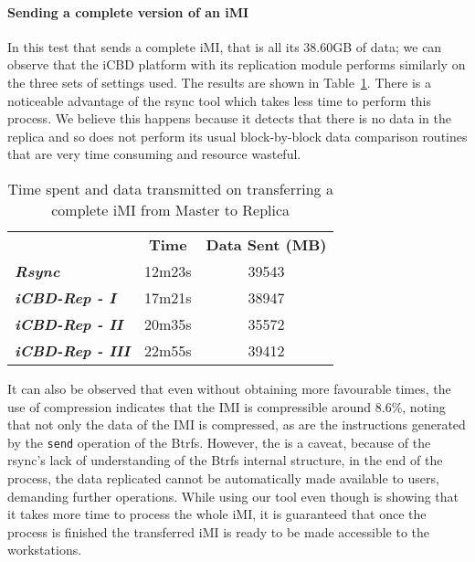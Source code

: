 
\paragraph{Sending a complete version of an iMI}
\label{par:eval_iMI_full}

In this test that sends a complete iMI, that is all its 38.60GB of data; we can observe that the iCBD platform with its replication module performs similarly on the three sets of settings used. The results are shown in Table~\ref{tab:eval_imifull}. There is a noticeable advantage of the rsync tool which takes less time to perform this process. We believe this happens because it detects that there is no data in the replica and so does not perform its usual block-by-block data comparison routines that are very time consuming and resource wasteful. 

\begin{table}[h]
\centering
\begin{tabular}{lcc}
 & \textbf{Time} & \textbf{Data Sent (MB)} \\ \cline{2-3} 
\textit{\textbf{Rsync}} & 12m23s & 39543 \\
\textit{\textbf{iCBD-Rep - I}} & 17m21s & 38947 \\
\textit{\textbf{iCBD-Rep - II}} & 20m35s & 35572 \\
\textit{\textbf{iCBD-Rep - III}} & 22m55s & 39412
\end{tabular}
\caption{Time spent and data transmitted on transferring a complete iMI from Master to Replica}
\label{tab:eval_imifull}
\end{table}

It can also be observed that even without obtaining more favourable times, the use of compression indicates that the IMI is compressible around 8.6\%, noting that not only the data of the IMI is compressed, as are the instructions generated by the \texttt{send} operation of the Btrfs.
However, the is a caveat, because of the rsync's lack of understanding of the Btrfs internal structure, in the end of the process, the data replicated cannot be automatically made available to users, demanding further operations. While using our tool even though is showing that it takes more time to process the whole iMI, it is guaranteed that once the process is finished the transferred iMI is ready to be made accessible to the workstations. 


